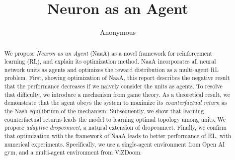 \documentclass{article} %
\title{Neuron as an Agent}
\author{Anonymous}
\begin{document}
\maketitle

\begin{abstract}
We propose {\em Neuron as an Agent} (NaaA) as a novel framework for reinforcement learning (RL), and explain its optimization method.
NaaA incorporates all neural network units as agents and optimizes the reward distribution as a multi-agent RL problem.
First, showing optimization of NaaA, this report describes the negative result that the performance decreases if we naively consider the units as agents.
To resolve that difficulty, we introduce a mechanism from game theory.
As a theoretical result, we demonstrate that the agent obeys the system to maximize its {\em counterfactual return} as the Nash equilibrium of the mechanism.
Subsequently, we show that learning counterfactual returns leads the model to learning optimal topology among units.
We propose {\em adaptive dropconnect}, a natural extension of dropconnect.
Finally, we confirm that optimization with the framework of NaaA leads to better performance of RL, with numerical experiments.
Specifically, we use a single-agent environment from Open AI gym, and a multi-agent environment from ViZDoom.
\end{abstract}













\end{document}
